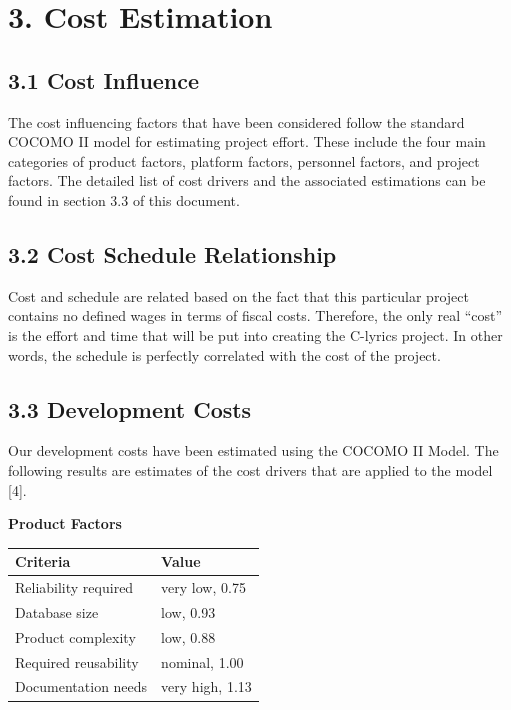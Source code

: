 \documentclass[]{article}
\begin{document}
\section{3. Cost Estimation}\label{cost-estimation}

\subsection{3.1 Cost Influence}\label{cost-influence}

The cost influencing factors that have been considered follow the
standard COCOMO II model for estimating project effort. These include
the four main categories of product factors, platform factors, personnel
factors, and project factors. The detailed list of cost drivers and the
associated estimations can be found in section 3.3 of this document.

\subsection{3.2 Cost Schedule
Relationship}\label{cost-schedule-relationship}

Cost and schedule are related based on the fact that this particular
project contains no defined wages in terms of fiscal costs. Therefore,
the only real ``cost'' is the effort and time that will be put into
creating the C-lyrics project. In other words, the schedule is perfectly
correlated with the cost of the project.

\subsection{3.3 Development Costs}\label{development-costs}

Our development costs have been estimated using the COCOMO II Model. The
following results are estimates of the cost drivers that are applied to
the model {[}4{]}.


\begin{center}
\textbf{Product Factors} \\
{
\centering
\begin{tabular}{ p{4cm} | p{4cm} }
Criteria & Value \\
\hline
Reliability required & very low, 0.75 \\
Database size & low, 0.93\\
Product complexity & low, 0.88 \\
Required reusability & nominal, 1.00\\
Documentation needs & very high, 1.13\\
\end{tabular}
}
\end{center}
\end{document}
